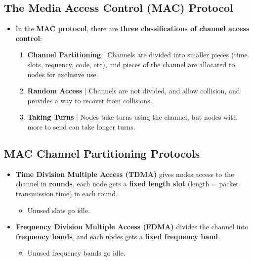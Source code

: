 \documentclass{article}
\begin{document}
    \subsection*{The Media Access Control (MAC) Protocol}
    \begin{itemize}
        \item In the \textbf{MAC protocol}, there are \textbf{three classifications of channel access control}:
        \begin{enumerate}
            \item \textbf{Channel Partitioning} | Channels are divided into smaller pieces (time slots, requency, code, etc), and pieces of the channel are allocated to nodes for exclusive use.
            \item \textbf{Random Access} | Channels are not divided, and allow collision, and provides a way to recover from collisions.
            \item \textbf{Taking Turns} | Nodes take turns using the channel, but nodes with more to send can take longer turns.
        \end{enumerate}
    \end{itemize}

    \subsection*{MAC Channel Partitioning Protocols}
    \begin{itemize}
        \item \textbf{Time Division Multiple Access (TDMA)} gives nodes access to the channel in \textbf{rounds}, each node gets a \textbf{fixed length slot} (length = packet transmission time) in each round.
        \begin{itemize}
            \item Unused slots go idle.
        \end{itemize}
        \item \textbf{Frequency Division Multiple Access (FDMA)} divides the channel into \textbf{frequency bands}, and each nodes gets a \textbf{fixed frequency band}.
        \begin{itemize}
            \item Unused frequency bands go idle.
        \end{itemize}
    \end{itemize}
\end{document}
